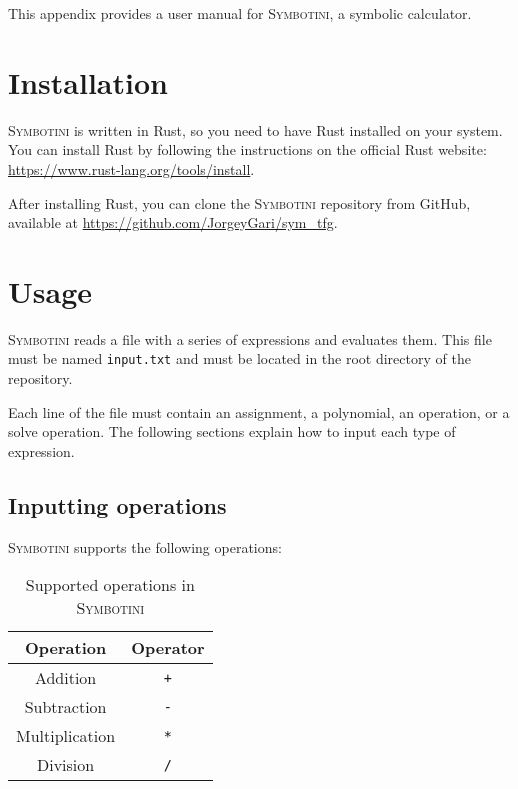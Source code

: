 This appendix provides a user manual for \textsc{Symbotini}, a symbolic calculator.

\section{Installation}

\textsc{Symbotini} is written in Rust, so you need to have Rust installed on your system. You can install Rust by following the instructions on the official Rust website: \url{https://www.rust-lang.org/tools/install}.

After installing Rust, you can clone the \textsc{Symbotini} repository from GitHub, available at \url{https://github.com/JorgeyGari/sym_tfg}.

\section{Usage}

\textsc{Symbotini} reads a file with a series of expressions and evaluates them. This file must be named \texttt{input.txt} and must be located in the root directory of the repository.

Each line of the file must contain an assignment, a polynomial, an operation, or a solve operation. The following sections explain how to input each type of expression.

\subsection{Inputting operations}

\textsc{Symbotini} supports the following operations:

\begin{table}[H]
    \centering
    \begin{tabular}{|c|c|}
        \hline
        \textbf{Operation} & \textbf{Operator} \\
        \hline
        Addition          & \texttt{+}      \\
        Subtraction       & \texttt{-}      \\
        Multiplication    & \texttt{*}      \\
        Division          & \texttt{/}      \\
        \hline
    \end{tabular}
    \caption{Supported operations in \textsc{Symbotini}}
\end{table}

